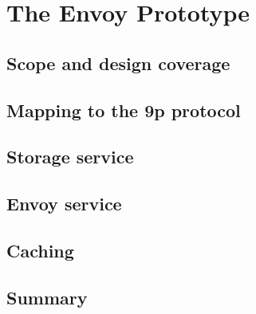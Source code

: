 \chapter{The Envoy Prototype}

\section{Scope and design coverage}
\section{Mapping to the 9p protocol}
\section{Storage service}
\section{Envoy service}
\section{Caching}

\section{Summary}